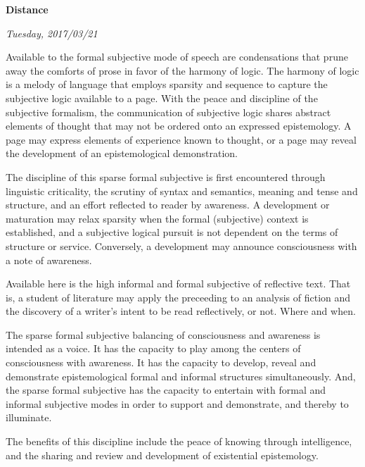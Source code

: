 

\centerline{\bf Distance}
\centerline{\it Tuesday, 2017/03/21}



\vfill
\break

Available to the formal subjective mode of speech are condensations
that prune away the comforts of prose in favor of the harmony of
logic.  The harmony of logic is a melody of language that employs
sparsity and sequence to capture the subjective logic available to a
page.  With the peace and discipline of the subjective formalism, the
communication of subjective logic shares abstract elements of thought
that may not be ordered onto an expressed epistemology.  A page may
express elements of experience known to thought, or a page may reveal
the development of an epistemological demonstration.

The discipline of this sparse formal subjective is first encountered
through linguistic criticality, the \break scrutiny of syntax and
semantics, meaning and tense and structure, and an effort reflected to
reader by awareness.  A development or maturation may relax sparsity
when the formal (subjective) context is established, and a subjective
logical pursuit is not dependent on the terms of structure or service.
Conversely, a development may announce consciousness with a note of
awareness.

Available here is the high informal and formal subjective of
reflective text.  That is, a student of literature may apply the
preceeding to an analysis of fiction and the discovery of a writer's
intent to be read reflectively, or not.  Where and when.

The sparse formal subjective balancing of \break consciousness and
awareness is intended as a voice.  It has the capacity to play among
the centers of consciousness with awareness.  It has the capacity to
develop, reveal and demonstrate epistemological formal and informal
structures simultaneously.  And, the sparse formal subjective has the
capacity to entertain with formal and informal subjective modes in
order to support and demonstrate, and thereby to illuminate.

The benefits of this discipline include the peace of knowing through
intelligence, and the sharing and review and development of
existential epistemology.

\vfill
\bye
